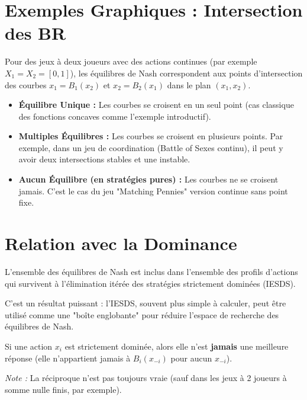 \section{Exemples Graphiques : Intersection des BR}
Pour des jeux à deux joueurs avec des actions continues (par exemple $X_1 = X_2 = [0,1]$), les équilibres de Nash correspondent aux points d'intersection des courbes $x_1 = B_1(x_2)$ et $x_2 = B_2(x_1)$ dans le plan $(x_1, x_2)$.

\begin{itemize}
    \item \textbf{Équilibre Unique :} Les courbes se croisent en un seul point (cas classique des fonctions concaves comme l'exemple introductif).
    \item \textbf{Multiples Équilibres :} Les courbes se croisent en plusieurs points. Par exemple, dans un jeu de coordination (Battle of Sexes continu), il peut y avoir deux intersections stables et une instable.
    \item \textbf{Aucun Équilibre (en stratégies pures) :} Les courbes ne se croisent jamais. C'est le cas du jeu "Matching Pennies" version continue sans point fixe.
\end{itemize}

\section{Relation avec la Dominance}

\begin{corollaire}
L'ensemble des équilibres de Nash est inclus dans l'ensemble des profils d'actions qui survivent à l'élimination itérée des stratégies strictement dominées (IESDS).
\end{corollaire}
\begin{remarque}
C'est un résultat puissant : l'IESDS, souvent plus simple à calculer, peut être utilisé comme une "boîte englobante" pour réduire l'espace de recherche des équilibres de Nash.
\end{remarque}

\begin{proposition}
Si une action $x_i$ est strictement dominée, alors elle n'est \textbf{jamais} une meilleure réponse (elle n'appartient jamais à $B_i(x_{-i})$ pour aucun $x_{-i}$).
\end{proposition}
\textit{Note :} La réciproque n'est pas toujours vraie (sauf dans les jeux à 2 joueurs à somme nulle finis, par exemple).

